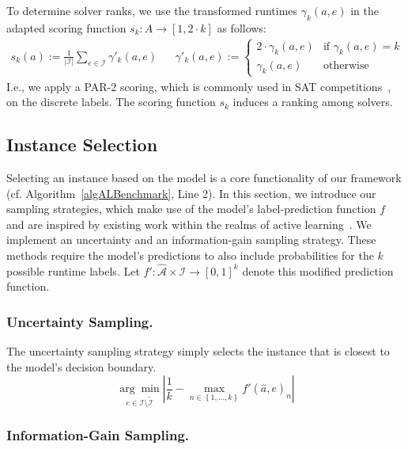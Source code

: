 \documentclass[runningheads]{llncs}
\begin{document}
To determine solver ranks, we use the transformed runtimes $\gamma_k(a, e)$ in the adapted scoring function $s_k : A \rightarrow [1, 2 \cdot k]$ as follows:
%
\begin{align}
  s_k(a) := \frac{1}{|\mathcal{I}|} \sum_{e \in \mathcal{I}} \gamma'_k(a, e)
  &&
  \gamma'_k(a, e) := \begin{cases}
  	2 \cdot \gamma_k(a, e) 	& \text{if } \gamma_k(a, e) = k\\
	\gamma_k(a, e)	& \text{otherwise}
  \end{cases}
  \label{eq:rankingeq}
\end{align}
%
I.e., we apply a PAR-2 scoring, which is commonly used in SAT competitions~\cite{FroleyksHIJS21}, on the discrete labels.
The scoring function $s_k$ induces a ranking among solvers.


\subsection{Instance Selection}
\label{sec:main:selection}

Selecting an instance based on the model is a core functionality of our framework (cf. Algorithm~\ref{algALBenchmark}, Line 2).
In this section, we introduce our sampling strategies, which make use of the model's label-prediction function $f$ and are inspired by existing work within the realms of active learning~\cite{settles2009active}.
We implement an uncertainty and an information-gain sampling strategy.
These methods require the model's predictions to also include probabilities for the $k$ possible runtime labels.
Let $f' : \mathcal{\hat A} \times \mathcal{I} \rightarrow \left[0, 1\right]^k$ denote this modified prediction function.

\subsubsection{Uncertainty Sampling.}

The uncertainty sampling strategy simply selects the instance that is closest to the model's decision boundary.
%
\begin{equation*}
  \underset{e \in \mathcal{I} \setminus \tilde{\mathcal{I}}}{\arg\min} \left\lvert \frac{1}{k} - \max_{n \in \left\lbrace 1, \dots, k \right\rbrace} f'\!\left(\hat{a}, e\right)_{n} \right\rvert
\end{equation*}

\subsubsection{Information-Gain Sampling.}
\end{document}
